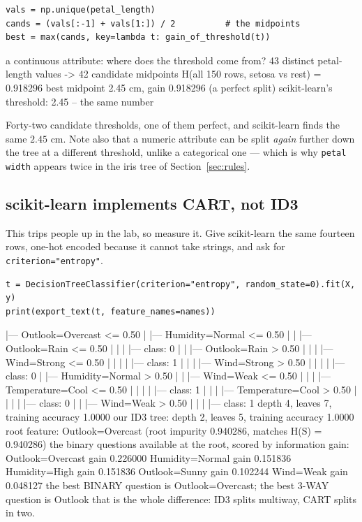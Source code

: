 \documentclass[11pt]{article}
\begin{document}
\begin{lstlisting}
vals = np.unique(petal_length)
cands = (vals[:-1] + vals[1:]) / 2          # the midpoints
best = max(cands, key=lambda t: gain_of_threshold(t))
\end{lstlisting}
\begin{codeout}
a continuous attribute: where does the threshold come from?
   43 distinct petal-length values -> 42 candidate midpoints
   H(all 150 rows, setosa vs rest) = 0.918296
   best midpoint 2.45 cm, gain 0.918296  (a perfect split)
   scikit-learn's threshold: 2.45  -- the same number
\end{codeout}

Forty-two candidate thresholds, one of them perfect, and scikit-learn finds
the same $2.45$ cm. Note also that a numeric attribute can be split
\emph{again} further down the tree at a different threshold, unlike a
categorical one --- which is why \texttt{petal width} appears twice in the
iris tree of Section~\ref{sec:rules}.

\subsection{scikit-learn implements CART, not ID3}

This trips people up in the lab, so measure it. Give scikit-learn the same
fourteen rows, one-hot encoded because it cannot take strings, and ask for
\texttt{criterion="entropy"}.

\begin{lstlisting}
t = DecisionTreeClassifier(criterion="entropy", random_state=0).fit(X, y)
print(export_text(t, feature_names=names))
\end{lstlisting}
\begin{codeout}
|--- Outlook=Overcast <= 0.50
|   |--- Humidity=Normal <= 0.50
|   |   |--- Outlook=Rain <= 0.50
|   |   |   |--- class: 0
|   |   |--- Outlook=Rain >  0.50
|   |   |   |--- Wind=Strong <= 0.50
|   |   |   |   |--- class: 1
|   |   |   |--- Wind=Strong >  0.50
|   |   |   |   |--- class: 0
|   |--- Humidity=Normal >  0.50
|   |   |--- Wind=Weak <= 0.50
|   |   |   |--- Temperature=Cool <= 0.50
|   |   |   |   |--- class: 1
|   |   |   |--- Temperature=Cool >  0.50
|   |   |   |   |--- class: 0
|   |   |--- Wind=Weak >  0.50
|   |   |   |--- class: 1
depth 4, leaves 7, training accuracy 1.0000
our ID3 tree: depth 2, leaves 5, training accuracy 1.0000
root feature: Outlook=Overcast   (root impurity 0.940286, matches H(S) = 0.940286)
the binary questions available at the root, scored by information gain:
   Outlook=Overcast       gain 0.226000
   Humidity=Normal        gain 0.151836
   Humidity=High          gain 0.151836
   Outlook=Sunny          gain 0.102244
   Wind=Weak              gain 0.048127
the best BINARY question is Outlook=Overcast; the best 3-WAY question is Outlook
that is the whole difference: ID3 splits multiway, CART splits in two.
\end{codeout}
\end{document}
